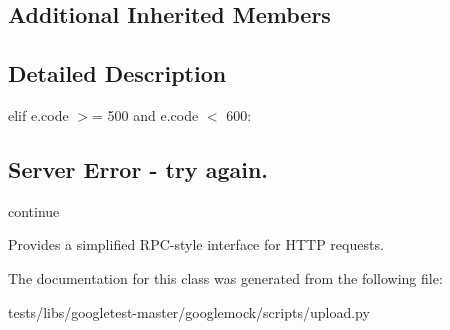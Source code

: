 \subsection*{Additional Inherited Members}


\subsection{Detailed Description}
elif e.\+code $>$= 500 and e.\+code $<$ 600\+: \subsection*{Server Error -\/ try again.}

continue \begin{DoxyVerb}Provides a simplified RPC-style interface for HTTP requests.\end{DoxyVerb}
 

The documentation for this class was generated from the following file\+:\begin{DoxyCompactItemize}
\item 
tests/libs/googletest-\/master/googlemock/scripts/upload.\+py\end{DoxyCompactItemize}
